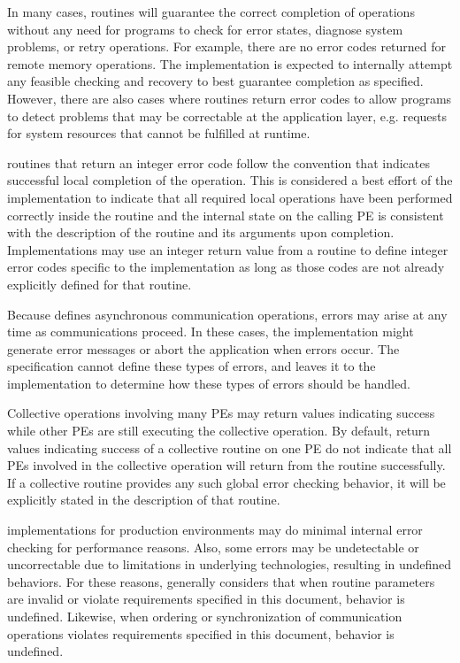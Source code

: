 In many cases, \openshmem routines will guarantee the correct completion of operations without any need for programs to check for error states, diagnose system problems, or retry operations. For example, there are no error codes returned for remote memory operations. The implementation is expected to internally attempt any feasible checking and recovery to best guarantee completion as specified. However, there are also cases where routines return error codes to allow programs to detect problems that may be correctable at the application layer, e.g. requests for system resources that cannot be fulfilled at runtime.

\CorCpp routines that return an integer error code follow the convention that  indicates successful local completion of the operation. This is considered a best effort of the implementation to indicate that all required local operations have been performed correctly inside the routine and the internal \openshmem state on the calling \ac{PE} is consistent with the description of the routine and its arguments upon completion. Implementations may use an integer return value from a routine to define integer error codes specific to the implementation as long as those codes are not already explicitly defined for that routine.

Because \openshmem defines asynchronous communication operations, errors may arise at any time as communications proceed. In these cases, the implementation might generate error messages or abort the application when errors occur. The \openshmem specification cannot define these types of errors, and leaves it to the implementation to determine how these types of errors should be handled.

Collective operations involving many \acp{PE} may return values indicating success while other \acp{PE} are still executing the collective operation. By default, return values indicating success of a collective routine on one \ac{PE} do not indicate that all \acp{PE} involved in the collective operation will return from the routine successfully. If a collective routine provides any such global error checking behavior, it will be explicitly stated in the description of that routine.

\openshmem implementations for production environments may do minimal internal error checking for performance reasons. Also, some errors may be undetectable or uncorrectable due to limitations in underlying technologies, resulting in undefined behaviors. For these reasons, \openshmem generally considers that when routine parameters are invalid or violate requirements specified in this document, behavior is undefined. Likewise, when ordering or synchronization of communication operations violates requirements specified in this document, behavior is undefined.

